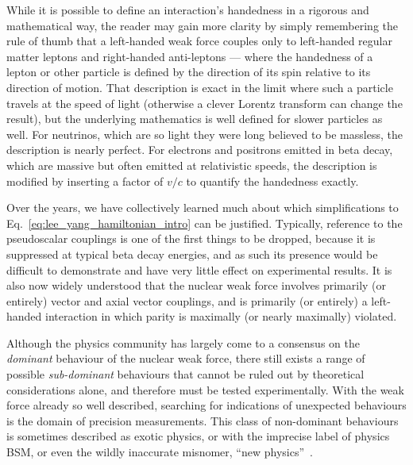 While it is possible to define an interaction's handedness in a rigorous and mathematical way, the reader may gain more clarity by simply remembering the rule of thumb that a left-handed weak force 
couples only to left-handed regular matter leptons and right-handed anti-leptons --- where the handedness of a lepton or other particle is defined by the direction of its spin relative to its direction of motion.  That description is exact in the limit where such a particle travels at the speed of light (otherwise a clever Lorentz transform can change the result), but the underlying mathematics is well defined for slower particles as well.  For neutrinos, which are so light they were long believed to be massless, the description is nearly perfect.  For electrons and positrons emitted in beta decay, which are massive but often emitted at relativistic speeds, the description is modified by inserting a factor of $v/c$ to quantify the handedness exactly.  


Over the years, we have collectively learned much about which simplifications to Eq.~\ref{eq:lee_yang_hamiltonian_intro} can be justified.  Typically, reference to the pseudoscalar couplings is one of the first things to be dropped, because it is suppressed at typical beta decay energies, and as such its presence would be difficult to demonstrate and have very little effect on experimental results.  
It is also now widely understood that 
the nuclear weak force involves primarily (or entirely) vector and axial vector couplings, and is primarily (or entirely) a left-handed interaction in which parity is maximally (or nearly maximally) violated.  



Although the physics community has largely come to a consensus 
on the \emph{dominant} behaviour of the nuclear weak force, there still exists a range of possible \emph{sub-dominant} behaviours that cannot be ruled out by theoretical considerations alone, and therefore must be tested experimentally.  With the weak force already so well described, searching for indications of unexpected behaviours is the domain of precision measurements.  This class of non-dominant behaviours is sometimes described as exotic physics, or with the imprecise label of physics \ac{BSM}, or even the wildly inaccurate misnomer, ``new physics''~\cite{Combs2020}\cite{GonzalesalonsoNaviliatcuncicSeverijns2019}\cite{newphysics_cirgiliano2019}\cite{newphysics_neutrinoless2015}\cite{newphysics_neutrinoless2007}\cite{newphysics_1998}\cite{newphysics_1992langacker}.  

